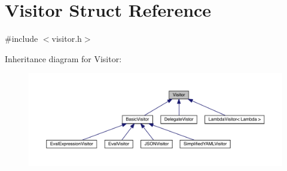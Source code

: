 \hypertarget{struct_visitor}{}\section{Visitor Struct Reference}
\label{struct_visitor}


{\ttfamily \#include $<$visitor.\+h$>$}



Inheritance diagram for Visitor\+:
\nopagebreak
\begin{figure}[H]
\begin{center}
\leavevmode
\includegraphics[width=350pt]{struct_visitor__inherit__graph}
\end{center}
\end{figure}
